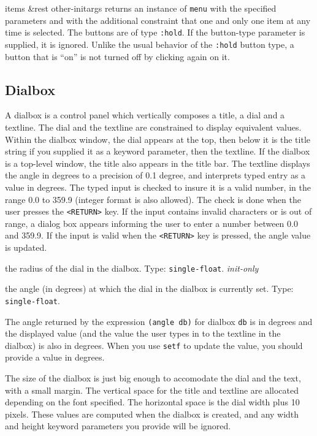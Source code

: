 \documentclass[twoside,openright,11pt]{report}
\newcommand{\tp}[1]{\texttt{#1}}
\begin{document}
{items \&rest other-initargs}
{returns an instance of \tp{menu} with the specified parameters
and with the additional constraint that one and only one item at any
time is selected.  The buttons are of type \tp{:hold}.  If the
button-type parameter is supplied, it is ignored.  Unlike the usual
behavior of the \tp{:hold} button type, a button that is ``on'' is
not turned off by clicking again on it.}

\subsection{Dialbox} \label{sec:dialbox}

A dialbox is a control panel which vertically composes
a title, a dial and a textline.  The dial and the textline are
constrained to display equivalent values.  Within the dialbox window,
the dial appears at the top, then below it is the title string if you
supplied it as a keyword parameter, then the textline.  If the dialbox
is a top-level window, the title also appears in the title bar.  The
textline displays the angle in degrees to a precision of 0.1 degree,
and interprets typed entry as a value in degrees.  The typed input is
checked to insure it is a valid number, in the range 0.0 to 359.9
(integer format is also allowed).  The check is done when the user
presses the \tp{<RETURN>} key.  If the input contains invalid
characters or is out of range, a dialog box appears informing the user
to enter a number between 0.0 and 359.9.  If the input is valid when
the \tp{<RETURN>} key is pressed, the angle value is updated.


{the radius of the dial in the dialbox.  Type: \tp{single-float}.
\textit{init-only}}

{the angle (in degrees) at which the dial in the dialbox is currently
set.  Type: \tp{single-float}.}

The angle returned by the expression \tp{(angle~db)} for dialbox
\tp{db} is in degrees and the displayed value (and the value the
user types in to the textline in the dialbox) is also in degrees.
When you use \tp{setf} to update the value, you should provide a
value in degrees.

The size of the dialbox is just big enough to accomodate the dial and
the text, with a small margin.  The vertical space for the title and
textline are allocated depending on the font specified.  The
horizontal space is the dial width plus 10 pixels.  These values are
computed when the dialbox is created, and any width and height keyword
parameters you provide will be ignored.
\end{document}
